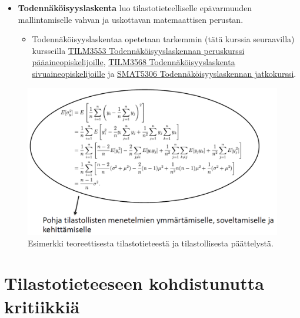 \documentclass[
]{book}
\providecommand{\tightlist}{%
  \setlength{\itemsep}{0pt}\setlength{\parskip}{0pt}}
\begin{document}
\begin{itemize}
\tightlist
\item
  \textbf{Todennäköisyyslaskenta} luo tilastotieteelliselle epävarmuuden mallintamiselle vahvan ja uskottavan matemaattisen perustan.

  \begin{itemize}
  \tightlist
  \item
    Todennäköisyyslaskentaa opetetaan tarkemmin (tätä kurssia seuraavilla) kursseilla \href{https://opas.peppi.utu.fi/fi/opintojakso/TILM3553/1734}{TILM3553 Todennäköisyyslaskennan peruskurssi pääaineopiskelijoille}, \href{https://opas.peppi.utu.fi/fi/opintojakso/TILM3568/3385}{TILM3568 Todennäköisyyslaskenta sivuaineopiskelijoille} ja \href{https://opas.peppi.utu.fi/fi/opintojakso/SMAT5306/4400}{SMAT5306 Todennäköisyyslaskennan jatkokurssi}.
  \end{itemize}
\end{itemize}

\begin{figure}

{\centering \includegraphics[width=1\linewidth]{images/teoreettinen} 

}

\caption{Esimerkki teoreettisesta tilastotieteestä ja tilastollisesta päättelystä.}\label{fig:teoreettinen}
\end{figure}

\newpage

\hypertarget{alaluku35}{%
\section{Tilastotieteeseen kohdistunutta kritiikkiä}\label{alaluku35}}
\end{document}
